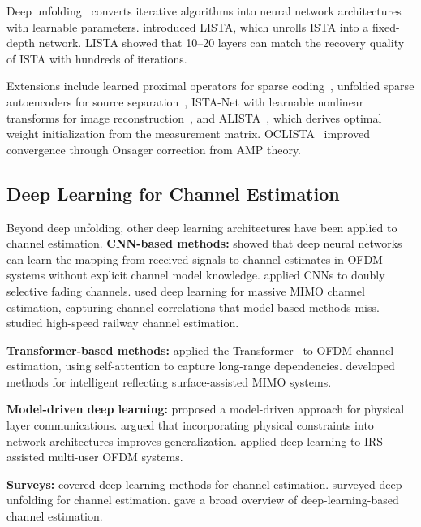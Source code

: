 \documentclass[a4paper,fleqn]{cas-sc}
\begin{document}
Deep unfolding~\citep{monga2021algorithm} converts iterative algorithms into neural network architectures with learnable parameters. \citet{gregor2010learning} introduced LISTA, which unrolls ISTA into a fixed-depth network. LISTA showed that 10--20 layers can match the recovery quality of ISTA with hundreds of iterations.

Extensions include learned proximal operators for sparse coding~\citep{sprechmann2015learning}, unfolded sparse autoencoders for source separation~\citep{wisdom2016full}, ISTA-Net with learnable nonlinear transforms for image reconstruction~\citep{he2019ista}, and ALISTA~\citep{liu2019alista}, which derives optimal weight initialization from the measurement matrix. OCLISTA~\citep{borgerding2020ista} improved convergence through Onsager correction from AMP theory.

\subsection{Deep Learning for Channel Estimation}

Beyond deep unfolding, other deep learning architectures have been applied to channel estimation. \textbf{CNN-based methods:} \citet{ye2018power} showed that deep neural networks can learn the mapping from received signals to channel estimates in OFDM systems without explicit channel model knowledge. \citet{gao2019deep} applied CNNs to doubly selective fading channels. \citet{dong2019deep} used deep learning for massive MIMO channel estimation, capturing channel correlations that model-based methods miss. \citet{soltani2019deep} studied high-speed railway channel estimation.

\textbf{Transformer-based methods:} \citet{zhang2020transformer} applied the Transformer~\citep{vaswani2017attention} to OFDM channel estimation, using self-attention to capture long-range dependencies. \citet{shen2022deep} developed methods for intelligent reflecting surface-assisted MIMO systems.

\textbf{Model-driven deep learning:} \citet{he2019model} proposed a model-driven approach for physical layer communications. \citet{wei2021model} argued that incorporating physical constraints into network architectures improves generalization. \citet{guo2020deep} applied deep learning to IRS-assisted multi-user OFDM systems.

\textbf{Surveys:} \citet{elbir2023deep} covered deep learning methods for channel estimation. \citet{gao2023deep} surveyed deep unfolding for channel estimation. \citet{ma2022deep} gave a broad overview of deep-learning-based channel estimation.
\end{document}
